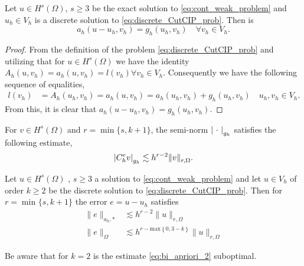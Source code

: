 \begin{lemma}
Let $u \in H^{s}( \Omega )  $, $ s\ge 3 $  be the exact solution to   \eqref{eq:cont_weak_problem} and $u_{h} \in V_{h}$ is a discrete solution to \eqref{eq:discrete_CutCIP_prob}. Then is \[
    a_{h}( u - u_{h}, v_{h}) = g_{h} ( u_{h}, v_{h}) \quad \forall v_{h} \in V_{h}.
    \]
\end{lemma}

\begin{proof}
   From the definition of the problem \eqref{eq:discrete_CutCIP_prob} and utilizing that for $u \in H^{s}( \Omega ) $ we have the identity  $A_{h}( u,v_{h}) = a_{h}( u,v_{h}) = l(v_{h} ) \forall v_{h} \in V_{h} $. Consequently we have the following
   sequence of equalities,  \[
       \begin{split}
   l(v_{h} ) & =  A_{h}( u_{h},v_{h}) =  a_{h}( u,v_{h})  = a_{h}( u_{h},v_{h})+g_{h}( u_{h},v_{h})  \quad  u_{h},v_{h} \in  V_{h}.
       \end{split}
   \]
    From this, it is clear that $a_{h}( u -  u_{h}, v_{h}) = g_{h}( u_{h},v_{h})  $.
\end{proof}

\begin{assumption}[EP2]
    \label{as:bi_EP2}
    For $v \in H^{s}( \Omega ) $ and $r = \min \{s,k+1 \} $, the semi-norm $\left\lvert  \ \cdot \   \right\rvert_{g_{h}} $ satisfies the following estimate, \[
    \left\lvert  C _{h}^{e} v  \right\rvert _{g_{h}} \lesssim  h^{r-2} \| v \|_{ r,\Omega  }^{  }.
    \]
\end{assumption}

\begin{theorem}
    \label{thm:apriori_result}
    Let $u \in H^{s}( \Omega ) $ , $s\ge 3$ a solution to \eqref{eq:cont_weak_problem} and let $u \in V_{h}$ of order $k\ge 2$ be the discrete solution to \eqref{eq:discrete_CutCIP_prob}. Then for $r = \min_{}\{s, k+1\} $ the error $e = u - u_{h}$ satisfies
    \begin{align}
        \label{eq:bi_apriori_1}
            \| e \|_{ a_{h},* }^{  } &\lesssim   h^{r-2} \| u \|_{ r,\Omega  }^{  }\\
        \label{eq:bi_apriori_2}
        \| e \|_{ \Omega  }^{  } &\lesssim   h^{r-\mathrm{max}\left\{ 0, 3-k \right\} } \| u \|_{ r,\Omega  }^{  }
    \end{align}

\end{theorem}
\begin{remark}
    Be aware that for $k=2$ is the estimate \eqref{eq:bi_apriori_2} suboptimal.
\end{remark}

